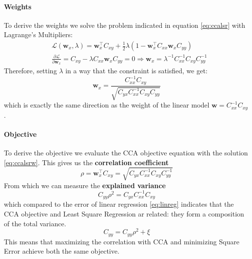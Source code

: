 \paragraph{Weights}
To derive the weights we solve the problem indicated in equation \ref{eq:ccalsr} with Lagrange's Multipliers:
\begin{align*}
	&\mathcal{L}(\mathbf{w}_x, \lambda) = \mathbf{w}_x^\top C_{xy} + \frac{1}{2} \lambda (1-\mathbf{w}_x^\top C_{xx}\mathbf{w}_x C_{yy}) \\
	&\frac{\partial \mathcal{L}}{\partial\mathbf{w}_x} = C_{xy}-\lambda C_{xx}\mathbf{w}_x C_{yy} = 0 \Longrightarrow \mathbf{w}_x = \lambda^{-1}C^{-1}_{xx}C_{xy}C_{yy}^{-1}
\end{align*}
Therefore, setting $\lambda$ in a way that the constraint is satisfied, we get:
\begin{equation}
	\mathbf{w}_x = \frac{C_{xx}^{-1}C_{xy}}{\sqrt{C_{yx}C_{xx}^{-1}C_{xy}C_{yy}}} \label{eq:ccalsrw}
\end{equation}
which is exactly the same direction as the weight of the linear model $\mathbf{w} = C_{xx}^{-1}C_{xy}$.
\paragraph{Objective} To derive the objective we evaluate the CCA objective equation with the solution \ref{eq:ccalsrw}. This gives us the \textbf{correlation coefficient}
\begin{equation*}
	\rho = \mathbf{w}_x^\top C_{xy} = \sqrt{C_{yx}C_{xx}^{-1}C_{xy}C_{yy}^{-1}}
\end{equation*}
From which we can measure the \textbf{explained variance}
\begin{equation}
	C_{yy}\rho^2 = C_{yx}C_{xx}^{-1}C_{xy} \label{eq:cca1}
\end{equation}
which compared to the error of linear regression \ref{eq:linreg} indicates that the CCA objective and Least Square Regression ar related: they form a composition of the total variance.
\begin{equation}
	C_{yy} = C_{yy}\rho^2 + \xi
\end{equation}
This means that maximizing the correlation with CCA and minimizing Square Error achieve both the same objective.

